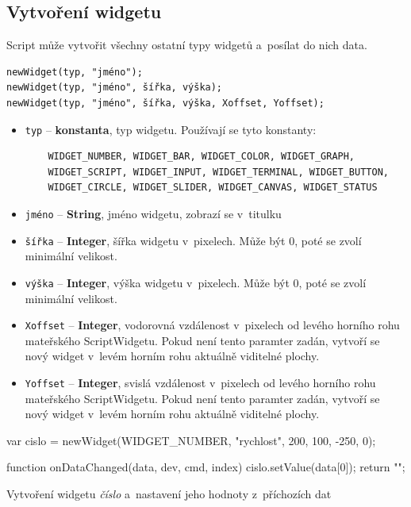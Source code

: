\documentclass[12pt, a4paper, oneside]{article}
\newcommand{\It}{\textit}  %
\begin{document}
\subsection*{Vytvoření widgetu}

Script může vytvořit všechny ostatní typy widgetů a~posílat do nich data. 
{\color{blue}
\begin{verbatim}newWidget(typ, "jméno");
newWidget(typ, "jméno", šířka, výška);
newWidget(typ, "jméno", šířka, výška, Xoffset, Yoffset);
\end{verbatim}
}

\begin{itemize}
    \item \verb|typ| -- {\bf konstanta}, typ widgetu. Používají se tyto konstanty:
    \begin{verbatim}
    WIDGET_NUMBER, WIDGET_BAR, WIDGET_COLOR, WIDGET_GRAPH,
    WIDGET_SCRIPT, WIDGET_INPUT, WIDGET_TERMINAL, WIDGET_BUTTON,
    WIDGET_CIRCLE, WIDGET_SLIDER, WIDGET_CANVAS, WIDGET_STATUS
    \end{verbatim}
    \item \verb/jméno/ -- {\bf String}, jméno widgetu, zobrazí se v~titulku
    \item \verb/šířka/ -- {\bf Integer}, šířka widgetu v~pixelech. Může být 0, poté se zvolí minimální velikost.
    \item \verb/výška/ -- {\bf Integer}, výška widgetu v~pixelech. Může být 0, poté se zvolí minimální velikost.
    \item \verb/Xoffset/ -- {\bf Integer}, vodorovná vzdálenost v~pixelech od levého horního rohu mateřského ScriptWidgetu. Pokud není tento paramter zadán, vytvoří se nový widget v~levém horním rohu aktuálně viditelné plochy.
    \item \verb/Yoffset/ -- {\bf Integer}, svislá vzdálenost v~pixelech od levého horního rohu mateřského ScriptWidgetu. Pokud není tento paramter zadán, vytvoří se nový widget v~levém horním rohu aktuálně viditelné plochy.
\end{itemize}

\begin{listing}[H]
\begin{jscode}
var cislo = newWidget(WIDGET_NUMBER,
                "rychlost", 200, 100, -250, 0);

function onDataChanged(data, dev, cmd, index) {
    cislo.setValue(data[0]);
    return "";
}
\end{jscode}
\caption{Vytvoření widgetu \It{číslo} a~nastavení jeho hodnoty z~příchozích dat}
\end{listing}
\end{document}
